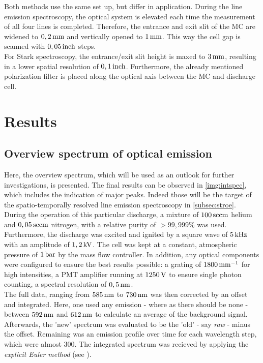 \documentclass[a4paper,10pt]{article}
\newcommand{\tilt}[1]{\textit{#1}}
\begin{document}
			Both methods use the same set up, but differ in application. During the line emission spectroscopy, the optical system is elevated each time the measurement of all four lines is completed. Therefore, the entrance and exit slit of the MC are widened to $\unit[0,2]{mm}$ and vertically opened to $\unit[1]{mm}$. This way the cell gap is scanned with $\unit[0,05]{inch}$ steps.\\
			For Stark spectroscopy, the entrance/exit slit height is maxed to $\unit[3]{mm}$, resulting in a lower spatial resolution of $\unit[0,1]{inch}$. Furthermore, the already mentioned polarization filter is placed along the optical axis between the MC and discharge cell.

	\section{Results}

		\subsection{Overview spectrum of optical emission}
		
			Here, the overview spectrum, which will be used as an outlook for further investigations, is presented. The final results can be observed in \autoref{img:intspec}, which includes the indication of major peaks. Indeed those will be the target of the spatio-temporally resolved line emission spectroscopy in \autoref{subsec:stroe}.\\
			During the operation of this particular discharge, a mixture of $\unit[100]{sccm}$ helium and $\unit[0,05]{sccm}$ nitrogen, with a relative purity of $>99,999\%$ was used. Furthermore, the discharge was excited and ignited by a square wave of $\unit[5]{kHz}$ with an amplitude of $\unit[1,2]{kV}$. The cell was kept at a constant, atmospheric pressure of $\unit[1]{bar}$ by the mass flow controller. In addition, any optical components were configured to ensure the best results possible: a grating of $\unit[1800]{mm^{-1}}$ for high intensities, a PMT amplifier running at $\unit[1250]{V}$ to ensure single photon counting, a spectral resolution of $\unit[0,5]{nm}$.\\
			The full data, ranging from $\unit[585]{nm}$ to $\unit[730]{nm}$ was then corrected by an offset and integrated. Here, one used any emission - where as there should be none - between $\unit[592]{nm}$ and $\unit[612]{nm}$ to calculate an average of the background signal. Afterwards, the 'new' spectrum was evaluated to be the 'old' - say \tilt{raw} - minus the offset. Remaining was an emission profile over time for each wavelength step, which were almost 300. The integrated spectrum was recieved by applying the \tilt{explicit Euler method} (see \cite{Wiki:Euler}).\\
		
\end{document}
